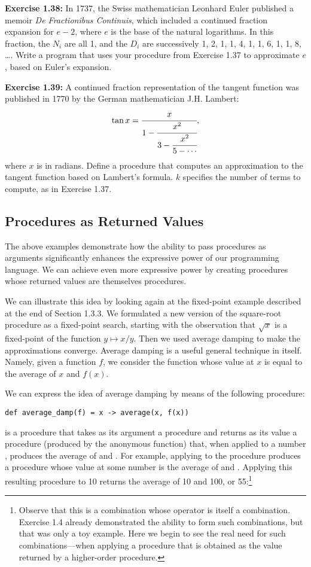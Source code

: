 \textbf{Exercise 1.38:} In 1737, the Swiss mathematician Leonhard Euler published a memoir \emph{De Fractionibus Continuis}, which included a continued fraction expansion for $e - 2$, where $e$ is the base of the natural logarithms. In this fraction, the $N_i$ are all 1, and the $D_i$ are successively 1, 2, 1, 1, 4, 1, 1, 6, 1, 1, 8, \ldots. Write a program that uses your  procedure from Exercise 1.37 to approximate $e$, based on Euler's expansion.

\textbf{Exercise 1.39:} A continued fraction representation of the tangent function was published in 1770 by the German mathematician J.H. Lambert:
\[
\tan x = \cfrac{x}{1 - \cfrac{x^2}{3 - \cfrac{x^2}{5 - \cdots}}},
\]
where $x$ is in radians. Define a procedure  that computes an approximation to the tangent function based on Lambert's formula. $k$ specifies the number of terms to compute, as in Exercise 1.37.

\subsection{Procedures as Returned Values}

The above examples demonstrate how the ability to pass procedures as arguments significantly enhances the expressive power of our programming language. We can achieve even more expressive power by creating procedures whose returned values are themselves procedures.

We can illustrate this idea by looking again at the fixed-point example described at the end of Section 1.3.3. We formulated a new version of the square-root procedure as a fixed-point search, starting with the observation that $\sqrt{x}$ is a fixed-point of the function $y \mapsto x/y$. Then we used average damping to make the approximations converge. Average damping is a useful general technique in itself. Namely, given a function $f$, we consider the function whose value at $x$ is equal to the average of $x$ and $f(x)$.

We can express the idea of average damping by means of the following procedure:

\begin{lstlisting}[style=slate]
def average_damp(f) = x -> average(x, f(x))
\end{lstlisting}

 is a procedure that takes as its argument a procedure  and returns as its value a procedure (produced by the anonymous function) that, when applied to a number , produces the average of  and . For example, applying  to the  procedure produces a procedure whose value at some number  is the average of  and . Applying this resulting procedure to 10 returns the average of 10 and 100, or 55:\footnote{Observe that this is a combination whose operator is itself a combination. Exercise 1.4 already demonstrated the ability to form such combinations, but that was only a toy example. Here we begin to see the real need for such combinations---when applying a procedure that is obtained as the value returned by a higher-order procedure.}

